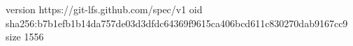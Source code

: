 version https://git-lfs.github.com/spec/v1
oid sha256:b7b1efb1b14da757de03d3dfdc64369f9615ca406bcd611c830270dab9167cc9
size 1556
